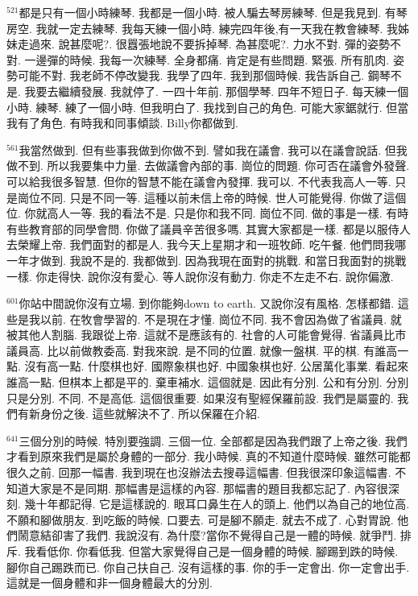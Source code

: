 \documentclass{book}
\begin{document}
$^{521}$都是只有一個小時練琴.
我都是一個小時.
被人騙去琴房練琴.
但是我見到.
有琴房空.
我就一定去練琴.
我每天練一個小時.
練完四年後,有一天我在教會練琴.
我姊妹走過來.
說甚麼呢?.
很囂張地說不要拆掉琴.
為甚麼呢?.
力水不對.
彈的姿勢不對.
一邊彈的時候.
我每一次練琴.
全身都痛.
肯定是有些問題.
緊張.
所有肌肉.
姿勢可能不對.
我老師不停改變我.
我學了四年.
我到那個時候.
我告訴自己.
鋼琴不是.
我要去繼續發展.
我就停了.
一四十年前.
那個學琴.
四年不短日子.
每天練一個小時.
練琴.
練了一個小時.
但我明白了.
我找到自己的角色.
可能大家鋸就行.
但當我有了角色.
有時我和同事傾談.
Billy你都做到.

$^{561}$我當然做到.
但有些事我做到你做不到.
譬如我在議會.
我可以在議會說話.
但我做不到.
所以我要集中力量.
去做議會內部的事.
崗位的問題.
你可否在議會外發聲.
可以給我很多智慧.
但你的智慧不能在議會內發揮.
我可以.
不代表我高人一等.
只是崗位不同.
只是不同一等.
這種以前未信上帝的時候.
世人可能覺得.
你做了這個位.
你就高人一等.
我的看法不是.
只是你和我不同.
崗位不同.
做的事是一樣.
有時有些教育部的同學會問.
你做了議員辛苦很多嗎.
其實大家都是一樣.
都是以服侍人去榮耀上帝.
我們面對的都是人.
我今天上星期才和一班牧師.
吃午餐.
他們問我哪一年才做到.
我說不是的.
我都做到.
因為我現在面對的挑戰.
和當日我面對的挑戰一樣.
你走得快.
說你沒有愛心.
等人說你沒有動力.
你走不左走不右.
說你偏激.

$^{601}$你站中間說你沒有立場.
到你能夠down to earth.
又說你沒有風格.
怎樣都錯.
這些是我以前.
在牧會學習的.
不是現在才懂.
崗位不同.
我不會因為做了省議員.
就被其他人割腦.
我跟從上帝.
這就不是應該有的.
社會的人可能會覺得.
省議員比市議員高.
比以前做教委高.
對我來說.
是不同的位置.
就像一盤棋.
平的棋.
有誰高一點.
沒有高一點.
什麼棋也好.
國際象棋也好.
中國象棋也好.
公居萬化事業.
看起來誰高一點.
但棋本上都是平的.
棄車補水.
這個就是.
因此有分別.
公和有分別.
分別只是分別.
不同.
不是高低.
這個很重要.
如果沒有聖經保羅前設.
我們是屬靈的.
我們有新身份之後.
這些就解決不了.
所以保羅在介紹.

$^{641}$三個分別的時候.
特別要強調.
三個一位.
全部都是因為我們跟了上帝之後.
我們才看到原來我們是屬於身體的一部分.
我小時候.
真的不知道什麼時候.
雖然可能都很久之前.
回那一幅書.
我到現在也沒辦法去搜尋這幅書.
但我很深印象這幅書.
不知道大家是不是同期.
那幅書是這樣的內容.
那幅書的題目我都忘記了.
內容很深刻.
幾十年都記得.
它是這樣說的.
眼耳口鼻生在人的頭上.
他們以為自己的地位高.
不願和腳做朋友.
到吃飯的時候.
口要去.
可是腳不願走.
就去不成了.
心對胃說.
他們鬧意結卻害了我們.
我說沒有.
為什麼?當你不覺得自己是一體的時候.
就爭鬥.
排斥.
我看低你.
你看低我.
但當大家覺得自己是一個身體的時候.
腳踢到跌的時候.
腳你自己踢跌而已.
你自己扶自己.
沒有這樣的事.
你的手一定會出.
你一定會出手.
這就是一個身體和非一個身體最大的分別.
\end{document}
